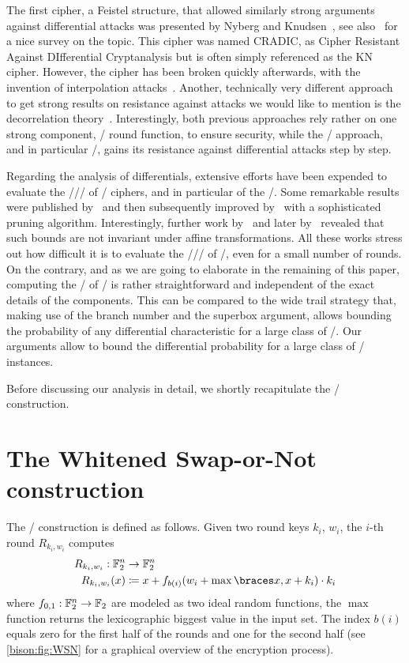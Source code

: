 The first cipher, a Feistel structure, that allowed similarly strong arguments against differential attacks was presented by Nyberg and Knudsen~\cite{JC:NybKnu95}, see also~\cite{FSE:Nyberg12} for a nice survey on the topic.
This cipher was named CRADIC, as Cipher Resistant Against DIfferential Cryptanalysis but is often simply referenced as the KN cipher.
However, the cipher has been broken quickly afterwards, with the invention of interpolation attacks~\cite{FSE:JakKnu97}.
Another, technically very different approach to get strong results on resistance against attacks we would like to mention is the decorrelation theory~\cite{STACS:Vaudenay98}.
Interestingly, both previous approaches rely rather on one strong component, \ie/ round function, to ensure security, while the \WSN/ approach, and in particular \bison/, gains its resistance against differential attacks step by step.

Regarding the analysis of differentials, extensive efforts have been expended to evaluate the \MEDP//\MELP/ of \SPN/ ciphers, and in particular of the \AES/.
Some remarkable results were published by~\cite{FSE:PSLL03} and then subsequently improved by~\cite{IETIS:KelSui07} with a sophisticated pruning algorithm.
Interestingly, further work by~\cite{SCN:DaeRij06} and later by~\cite{EC:CanRou15} revealed that such bounds are not invariant under affine transformations.
All these works stress out how difficult it is to evaluate the \MEDP//\MELP/ of \SPNp/, even for a small number of rounds.
On the contrary, and as we are going to elaborate in the remaining of this paper, computing the \MEDP/ of \bison/ is rather straightforward and independent of the exact details of the components.
This can be compared to the wide trail strategy that, making use of the branch number and the superbox argument, allows bounding the probability of any differential characteristic for a large class of \SPNp/.
Our arguments allow to bound the differential probability for a large class of \WSN/ instances.

Before discussing our analysis in detail, we shortly recapitulate the \WSN/ construction.

\section{The Whitened Swap-or-Not construction}\label{sec:bison:wsn}

The \WSN/ construction is defined as follows.
Given two round keys $k_i$, $w_i$, the $i$-th round $R_{k_i,w_i}$ computes
\begin{align*}
    R_{k_i,w_i} : \F_2^n &\to \F_2^n \\
    R_{k_i,w_i}(x) &\coloneqq x + f_{b(i)}(w_i + \max\set{x, x + k_i}) \cdot k_i
\end{align*}
where $f_{0,1} : \mathbb{F}_2^n \to \mathbb{F}_2$ are modeled as two ideal random functions, the $\max$ function returns the lexicographic biggest value in the input set.
The index $b(i)$ equals zero for the first half of the rounds and one for the second half (see \cref{bison:fig:WSN} for a graphical overview of the encryption process).

